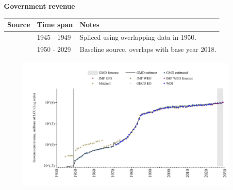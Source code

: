 \documentclass[12pt,a4paper,landscape]{article}
\begin{document}
\begin{adjustbox}{max totalsize={\paperwidth}{\paperheight},center}
\begin{minipage}[t][\textheight][t]{\textwidth}
\vspace*{0.5cm}
{}
\begin{center}
{\Large\bfseries Government revenue}
\end{center}
\vspace{0.5cm}
\begin{table}[H]
\centering
\small
\begin{tabular}{|l|l|l|}
\hline
\textbf{Source} & \textbf{Time span} & \textbf{Notes} \\
\hline
\rowcolor{white}\cite{Mitchell}& 1945 - 1949 &Spliced using overlapping data in 1950. \\
\rowcolor{lightgray}\cite{GMD_estimated}& 1950 - 2029 &Baseline source, overlaps with base year 2018. \\
\hline
\end{tabular}
\end{table}
\begin{figure}[H]
\centering
\includegraphics[width=\textwidth,height=0.6\textheight,keepaspectratio]{graphs/ISR_govrev.pdf}
\end{figure}
\end{minipage}
\end{adjustbox}
\end{document}
